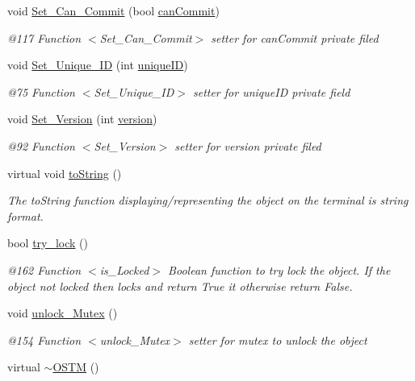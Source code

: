 \begin{DoxyCompactItemize}
void \hyperlink{class_o_s_t_m_a813ee61c9d1c83c6a6ae30d12aca8a5d_a813ee61c9d1c83c6a6ae30d12aca8a5d}{Set\+\_\+\+Can\+\_\+\+Commit} (bool \hyperlink{class_o_s_t_m_a2a5b89641af274ddc69bdf8c1c1a07d6_a2a5b89641af274ddc69bdf8c1c1a07d6}{can\+Commit})
\begin{DoxyCompactList}\small\item\em @117 Function $<$\+Set\+\_\+\+Can\+\_\+\+Commit$>$ setter for can\+Commit private filed \end{DoxyCompactList}\item 
void \hyperlink{class_o_s_t_m_ab5019a32185631c08abbf826422f2d93_ab5019a32185631c08abbf826422f2d93}{Set\+\_\+\+Unique\+\_\+\+ID} (int \hyperlink{class_o_s_t_m_aa9fe59368b701af7f70befa23bd6901a_aa9fe59368b701af7f70befa23bd6901a}{unique\+ID})
\begin{DoxyCompactList}\small\item\em @75 Function $<$\+Set\+\_\+\+Unique\+\_\+\+I\+D$>$ setter for unique\+ID private field \end{DoxyCompactList}\item 
void \hyperlink{class_o_s_t_m_a9529ad8d6d28c1f0cc9b86ed91df1ae1_a9529ad8d6d28c1f0cc9b86ed91df1ae1}{Set\+\_\+\+Version} (int \hyperlink{class_o_s_t_m_a9a6ea36181be2db7f9082d77956511d7_a9a6ea36181be2db7f9082d77956511d7}{version})
\begin{DoxyCompactList}\small\item\em @92 Function $<$\+Set\+\_\+\+Version$>$ setter for version private filed \end{DoxyCompactList}\item 
virtual void \hyperlink{class_o_s_t_m_a513396a115f2987fd07c203309ae8a59_a513396a115f2987fd07c203309ae8a59}{to\+String} ()
\begin{DoxyCompactList}\small\item\em The to\+String function displaying/representing the object on the terminal is string format. \end{DoxyCompactList}\item 
bool \hyperlink{class_o_s_t_m_af3dd41488087b678c95b2f5c16486947_af3dd41488087b678c95b2f5c16486947}{try\+\_\+lock} ()
\begin{DoxyCompactList}\small\item\em @162 Function $<$is\+\_\+\+Locked$>$ Boolean function to try lock the object. If the object not locked then locks and return True it otherwise return False. \end{DoxyCompactList}\item 
void \hyperlink{class_o_s_t_m_a6cd703bc26c719fd95b4f5362d050762_a6cd703bc26c719fd95b4f5362d050762}{unlock\+\_\+\+Mutex} ()
\begin{DoxyCompactList}\small\item\em @154 Function $<$unlock\+\_\+\+Mutex$>$ setter for mutex to unlock the object \end{DoxyCompactList}\item 
virtual \hyperlink{class_o_s_t_m_a30a17d73d0259c60eeab72d6dfa9ceb1_a30a17d73d0259c60eeab72d6dfa9ceb1}{$\sim$\+O\+S\+TM} ()
\end{DoxyCompactItemize}
